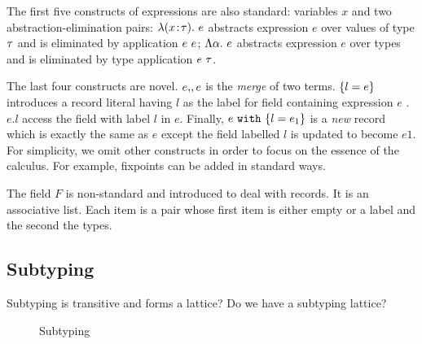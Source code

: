 The first five constructs of expressions are also standard: variables $ x $ and two
abstraction-elimination pairs: $ \lambda (x \!:\! \tau).~ e $ abstracts expression
$ e $ over values of type $ \tau $ and is eliminated by application $ {e} ~ {e} $;
$ \Lambda \alpha.~ e $ abstracts expression $ e $ over types and is eliminated by
type application $ {e} ~ {\tau} $.

The last four constructs are novel. $ e ,\!, e $ is the \emph{merge} of two
terms. 
$ \{ l = e \} $ introduces a record literal having $ l $ as the
label for field containing expression $ e $ . $ e.l $ access the field with
label $ l $ in $ e $. Finally, $ e ~ \texttt{with} ~ \{ l = e_1 \} $ is a \emph{new}
record which is exactly the same as $ e $ except the field labelled $ l $ is
updated to become $ e1 $. For simplicity, we omit other constructs in order to
focus on the essence of the calculus. For example, fixpoints can be added in
standard ways.

The field $ F $ is non-standard and introduced to deal with records. It is an
associative list. Each item is a pair whose first item is either empty or a
label and the second the types.




\subsection{Subtyping}

Subtyping is transitive and forms a lattice?
Do we have a subtyping lattice?

\begin{figure}

\caption{Subtyping}
\end{figure}

